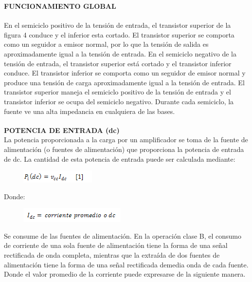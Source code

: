 \documentclass[10pt,a4paper]{article}
\begin{document}
\textbf{FUNCIONAMIENTO GLOBAL}\\\\
En el semiciclo positivo de la tensión de entrada, el transistor superior de la figura 4 conduce y el inferior esta cortado. El transistor superior se comporta como un seguidor a emisor normal, por lo que la tensión de salida es aproximadamente igual a la tensión de entrada.
En el semiciclo negativo de la tensión de entrada, el transistor superior está cortado y el transistor inferior conduce. El transistor inferior se comporta como un seguidor de emisor normal y produce una tensión de carga aproximadamente igual a la tensión de entrada. El transistor superior maneja el semiciclo positivo de la tensión de entrada y el transistor inferior se ocupa del semiciclo negativo. Durante cada semiciclo, la fuente ve una alta impedancia en cualquiera de las bases.\\\\
\newpage
\textbf{POTENCIA DE ENTRADA (dc)}\\
La potencia proporcionada a la carga por un amplificador se toma de la fuente de alimentación (o fuentes de alimentación) que proporciona la potencia de entrada de dc. La cantidad de esta potencia de entrada puede ser calculada mediante:\\
\begin{center}
\begin{figure}[hbtp]
\centering
\includegraphics[scale=0.5]{11.png}
\end{figure}
\end{center}
Donde:\\

\begin{center}
\begin{figure}[hbtp]
\centering
\includegraphics[scale=0.5]{12.png}
\end{figure}
\end{center}
Se consume de las fuentes de alimentación. En la operación clase B, el consumo de corriente de una sola fuente de alimentación tiene la forma de una señal rectificada de onda completa, mientras que la extraída de dos fuentes de alimentación tiene la forma de una señal rectificada demedia onda de cada fuente. Donde el valor promedio de la corriente puede expresarse de la siguiente manera.\\
\end{document}
